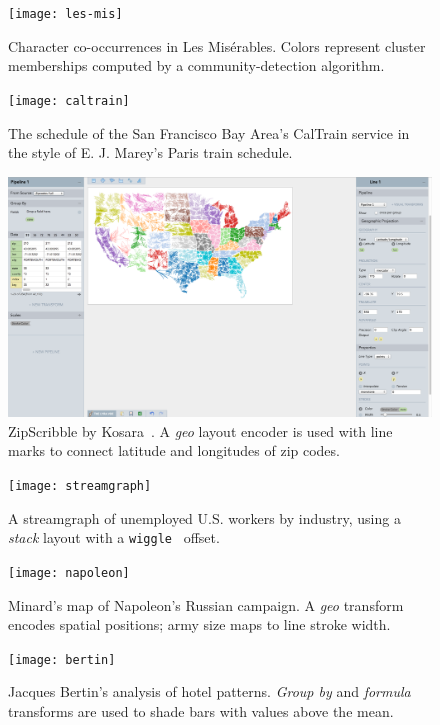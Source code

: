 \begin{figure}[h!]
  \centering
  \texttt{[image: les-mis]}
  \caption{Character co-occurrences in Les
Mis\'{e}rables. Colors represent cluster memberships computed by a
community-detection algorithm.}
  \label{fig:lyra:les_mis}
\end{figure}

\begin{figure}[h!]
  \centering
  \texttt{[image: caltrain]}
  \caption{The schedule of the San Francisco Bay Area's CalTrain service in the style of E. J. Marey's Paris train schedule.}
  \label{fig:lyra:caltrain}
\end{figure}

\begin{figure}[h!]
  \centering
  \includegraphics[width=\columnwidth]{zipscribble}
  \caption{ZipScribble by Kosara~\cite{kosara:zipscribble}. A \emph{geo} layout
 encoder is used with line marks to connect latitude and longitudes of zip
 codes.}
  \label{fig:lyra:zipscribble}
\end{figure}

\begin{figure}[h!]
  \centering
  \texttt{[image: streamgraph]}
  \caption{A streamgraph of unemployed U.S. workers by industry, using a
  \emph{stack} layout with a \texttt{wiggle}~\cite{byron:streamgraph} offset.}
  \label{fig:lyra:streamgraph}
\end{figure}

\begin{figure}[h!]
  \centering
  \texttt{[image: napoleon]}
  \caption{Minard's map of Napoleon's Russian campaign. A \emph{geo} transform
 encodes spatial positions; army size maps to line stroke width.}
  \label{fig:lyra:napoleon}
\end{figure}

\begin{figure}[h!]
  \centering
  \texttt{[image: bertin]}
  \caption{Jacques Bertin's analysis of hotel patterns. \emph{Group by} and \emph{formula}
 transforms are used to shade bars with values above the mean.}
  \label{fig:lyra:bertin}
\end{figure}

